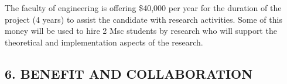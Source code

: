 \documentclass[a4paper,12pt]{scrartcl}
\renewcommand{\todo}[1]{}
\begin{document}
\begin{enumerate}
 
 \end{enumerate}

The faculty of engineering is offering \$40,000 per year for the duration of the project (4 years) to assist the candidate with research activities. Some of this money will be used to hire 2 Msc students by research who will support the theoretical and implementation aspects of the research.

\subsection*{6. BENEFIT AND COLLABORATION}


\todo{Morri, Ron: can you suggest some other research organisations within Australia? And how UNSW will utilise the project?}

% 
% 
% 
% 
% 
% 
 
\end{document}
